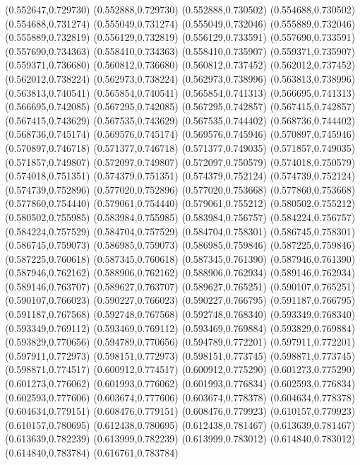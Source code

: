 (0.552647,0.729730)
(0.552888,0.729730)
(0.552888,0.730502)
(0.554688,0.730502)
(0.554688,0.731274)
(0.555049,0.731274)
(0.555049,0.732046)
(0.555889,0.732046)
(0.555889,0.732819)
(0.556129,0.732819)
(0.556129,0.733591)
(0.557690,0.733591)
(0.557690,0.734363)
(0.558410,0.734363)
(0.558410,0.735907)
(0.559371,0.735907)
(0.559371,0.736680)
(0.560812,0.736680)
(0.560812,0.737452)
(0.562012,0.737452)
(0.562012,0.738224)
(0.562973,0.738224)
(0.562973,0.738996)
(0.563813,0.738996)
(0.563813,0.740541)
(0.565854,0.740541)
(0.565854,0.741313)
(0.566695,0.741313)
(0.566695,0.742085)
(0.567295,0.742085)
(0.567295,0.742857)
(0.567415,0.742857)
(0.567415,0.743629)
(0.567535,0.743629)
(0.567535,0.744402)
(0.568736,0.744402)
(0.568736,0.745174)
(0.569576,0.745174)
(0.569576,0.745946)
(0.570897,0.745946)
(0.570897,0.746718)
(0.571377,0.746718)
(0.571377,0.749035)
(0.571857,0.749035)
(0.571857,0.749807)
(0.572097,0.749807)
(0.572097,0.750579)
(0.574018,0.750579)
(0.574018,0.751351)
(0.574379,0.751351)
(0.574379,0.752124)
(0.574739,0.752124)
(0.574739,0.752896)
(0.577020,0.752896)
(0.577020,0.753668)
(0.577860,0.753668)
(0.577860,0.754440)
(0.579061,0.754440)
(0.579061,0.755212)
(0.580502,0.755212)
(0.580502,0.755985)
(0.583984,0.755985)
(0.583984,0.756757)
(0.584224,0.756757)
(0.584224,0.757529)
(0.584704,0.757529)
(0.584704,0.758301)
(0.586745,0.758301)
(0.586745,0.759073)
(0.586985,0.759073)
(0.586985,0.759846)
(0.587225,0.759846)
(0.587225,0.760618)
(0.587345,0.760618)
(0.587345,0.761390)
(0.587946,0.761390)
(0.587946,0.762162)
(0.588906,0.762162)
(0.588906,0.762934)
(0.589146,0.762934)
(0.589146,0.763707)
(0.589627,0.763707)
(0.589627,0.765251)
(0.590107,0.765251)
(0.590107,0.766023)
(0.590227,0.766023)
(0.590227,0.766795)
(0.591187,0.766795)
(0.591187,0.767568)
(0.592748,0.767568)
(0.592748,0.768340)
(0.593349,0.768340)
(0.593349,0.769112)
(0.593469,0.769112)
(0.593469,0.769884)
(0.593829,0.769884)
(0.593829,0.770656)
(0.594789,0.770656)
(0.594789,0.772201)
(0.597911,0.772201)
(0.597911,0.772973)
(0.598151,0.772973)
(0.598151,0.773745)
(0.598871,0.773745)
(0.598871,0.774517)
(0.600912,0.774517)
(0.600912,0.775290)
(0.601273,0.775290)
(0.601273,0.776062)
(0.601993,0.776062)
(0.601993,0.776834)
(0.602593,0.776834)
(0.602593,0.777606)
(0.603674,0.777606)
(0.603674,0.778378)
(0.604634,0.778378)
(0.604634,0.779151)
(0.608476,0.779151)
(0.608476,0.779923)
(0.610157,0.779923)
(0.610157,0.780695)
(0.612438,0.780695)
(0.612438,0.781467)
(0.613639,0.781467)
(0.613639,0.782239)
(0.613999,0.782239)
(0.613999,0.783012)
(0.614840,0.783012)
(0.614840,0.783784)
(0.616761,0.783784)
